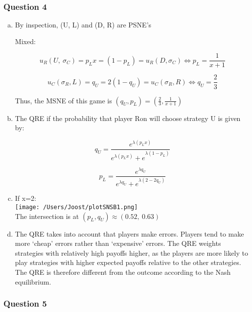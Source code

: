 \documentclass[a4paper]{article}
\begin{document}
\subsubsection{Question 4}

\begin{enumerate}[(a)]
\item


By inspection, (U, L) and (D, R) are PSNE's

Mixed:

\[u_{R}\left( U,\ \sigma_{C} \right) = p_{L}x = \left( 1 - p_{L} \right) = u_{R}\left( D,\sigma_{C} \right) \Leftrightarrow p_{L} = \frac{1}{x + 1}\]

\[u_{C}\left( \sigma_{R},L \right) = q_{U} = 2\left( 1 - q_{U} \right) = u_{C}\left( \sigma_{R},R \right) \Leftrightarrow q_{U} = \frac{2}{3}\]

Thus, the MSNE of this game is
\(\left( q_{U},p_{L} \right) = \left( \frac{2}{3},\frac{1}{x + 1} \right)\)
\item
The QRE if the probability that player Ron will choose strategy U is
given by:

\[q_{U} = \frac{e^{\lambda(p_{L}x)}}{{e^{\lambda\left( p_{L}x \right)} + e}^{\lambda(1 - p_{L})}}\]

\[p_{L} = \frac{e^{\lambda q_{U}}}{{e^{\lambda q_{U}} + e}^{\lambda\left( 2 - 2q_{U} \right)}}\]

\item
If x=2:\\
\texttt{[image: /Users/Joost/plotSNSB1.png]}\\
The intersection is at \(\left( p_{L},q_{U} \right) \approx (0.52,\ 0.63)\)

\item The QRE takes into account that players make errors. Players tend
to make more `cheap' errors rather than `expensive' errors. The QRE
weights strategies with relatively high payoffs higher, as the players
are more likely to play strategies with higher expected payoffs relative
to the other strategies. The QRE is therefore different from the outcome
according to the Nash equilibrium.

\end{enumerate}
\subsubsection{Question 5}
\end{document}
